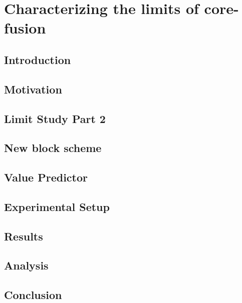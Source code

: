 \chapter{Characterizing the limits of core-fusion}

\section{Introduction}\label{sect:introduction-chapter3}

\section{Motivation}\label{sect:ch3-motivation}

\section{Limit Study Part 2}

\section{New block scheme}

\section{Value Predictor}

\section{Experimental Setup}

\section{Results}
\section{Analysis}

\section{Conclusion}
%
%
%